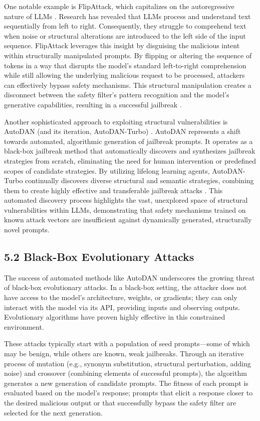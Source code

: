 \documentclass[11pt,a4paper]{article}
\begin{document}
One notable example is FlipAttack, which capitalizes on the autoregressive nature of LLMs \cite{Liu_2024_Flipattack}. Research has revealed that LLMs process and understand text sequentially from left to right. Consequently, they struggle to comprehend text when noise or structural alterations are introduced to the left side of the input sequence. FlipAttack leverages this insight by disguising the malicious intent within structurally manipulated prompts. By flipping or altering the sequence of tokens in a way that disrupts the model's standard left-to-right comprehension while still allowing the underlying malicious request to be processed, attackers can effectively bypass safety mechanisms. This structural manipulation creates a disconnect between the safety filter's pattern recognition and the model's generative capabilities, resulting in a successful jailbreak \cite{Liu_2024_Flipattack}.

Another sophisticated approach to exploiting structural vulnerabilities is AutoDAN (and its iteration, AutoDAN-Turbo) \cite{Liu_2024_Autodan}. AutoDAN represents a shift towards automated, algorithmic generation of jailbreak prompts. It operates as a black-box jailbreak method that automatically discovers and synthesizes jailbreak strategies from scratch, eliminating the need for human intervention or predefined scopes of candidate strategies. By utilizing lifelong learning agents, AutoDAN-Turbo continually discovers diverse structural and semantic strategies, combining them to create highly effective and transferable jailbreak attacks \cite{Liu_2024_Autodan}. This automated discovery process highlights the vast, unexplored space of structural vulnerabilities within LLMs, demonstrating that safety mechanisms trained on known attack vectors are insufficient against dynamically generated, structurally novel prompts.

\subsection{5.2 Black-Box Evolutionary Attacks}
The success of automated methods like AutoDAN underscores the growing threat of black-box evolutionary attacks. In a black-box setting, the attacker does not have access to the model's architecture, weights, or gradients; they can only interact with the model via its API, providing inputs and observing outputs. Evolutionary algorithms have proven highly effective in this constrained environment.

These attacks typically start with a population of seed prompts---some of which may be benign, while others are known, weak jailbreaks. Through an iterative process of mutation (e.g., synonym substitution, structural perturbation, adding noise) and crossover (combining elements of successful prompts), the algorithm generates a new generation of candidate prompts. The fitness of each prompt is evaluated based on the model's response; prompts that elicit a response closer to the desired malicious output or that successfully bypass the safety filter are selected for the next generation.
\end{document}
